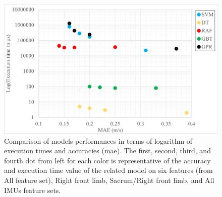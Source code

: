 \begin{figure}[htbp]
\centering
\includegraphics[width=.95\linewidth]{chapters/Speed/figures/Timevsaccuracy.png}
\caption{Comparison of models performances in terms of logarithm of execution times and accuracies (\gls{mae}). The first, second, third, and fourth dot from left for each color is representative of the accuracy and execution time value of the related model on six features (from All feature set), Right front limb, Sacrum/Right front limb, and All IMUs feature sets.}
\label{timevsaccra}
\end{figure}